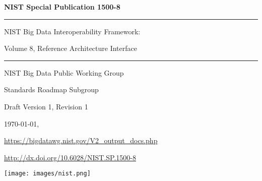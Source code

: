 \begin{flushright}
{\Large\bf NIST Special Publication 1500-8} 

\bigskip\bigskip

\hrule
\bigskip\bigskip

{\Huge\bf {\sf
NIST Big Data Interoperability Framework:

\bigskip

Volume 8, Reference Architecture Interface
}}


\bigskip\bigskip
\hrule

\vspace{2cm}

{\large

NIST Big Data Public Working Group

Standards Roadmap Subgroup

\vspace{2cm}

Draft Version 1, Revision 1 

\today, \currenttime

\url{https://bigdatawg.nist.gov/V2_output_docs.php}
 
\bigskip


\bigskip

\bigskip

\bigskip
\url{http://dx.doi.org/10.6028/NIST.SP.1500-8}

}
\vspace{2cm}

\vfill

\begin{flushright}
\texttt{[image: images/nist.png]}
\end{flushright}

\end{flushright}

\newpage

